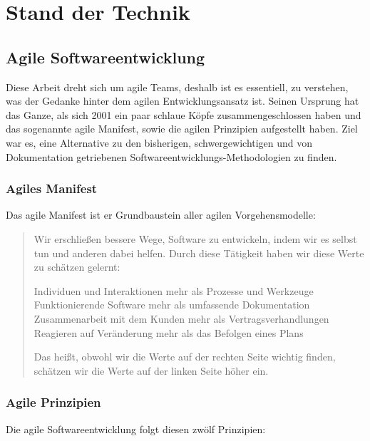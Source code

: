 \chapter{Stand der Technik}

\section{Agile Softwareentwicklung}

Diese Arbeit dreht sich um agile Teams, deshalb ist es essentiell, zu verstehen, was der Gedanke hinter dem agilen Entwicklungsansatz ist.
Seinen Ursprung hat das Ganze, als sich 2001 ein paar schlaue Köpfe zusammengeschlossen haben und das sogenannte agile Manifest, sowie die agilen Prinzipien aufgestellt haben.
Ziel war es, eine Alternative zu den bisherigen, schwergewichtigen und von Dokumentation getriebenen Softwareentwicklungs-Methodologien zu finden.

\subsection{Agiles Manifest}

Das agile Manifest ist er Grundbaustein aller agilen Vorgehensmodelle:

\begin{quote}Wir erschließen bessere Wege, Software zu entwickeln,
indem wir es selbst tun und anderen dabei helfen.
Durch diese Tätigkeit haben wir diese Werte zu schätzen gelernt: \newline
\begin{center}
Individuen und Interaktionen mehr als Prozesse und Werkzeuge \newline
Funktionierende Software mehr als umfassende Dokumentation \newline
Zusammenarbeit mit dem Kunden mehr als Vertragsverhandlungen \newline
Reagieren auf Veränderung mehr als das Befolgen eines Plans \newline
\end{center}
Das heißt, obwohl wir die Werte auf der rechten Seite wichtig finden,
schätzen wir die Werte auf der linken Seite höher ein.\end{quote}\cite{agile_manifest}

\subsection{Agile Prinzipien}

Die agile Softwareentwicklung folgt diesen zwölf Prinzipien:

